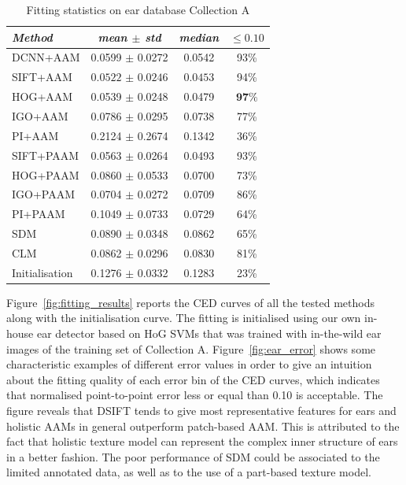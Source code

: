 \begin{table}[t!]
\small
\centering
\begin{tabular}{|l|c|c|c|}
\hline
\emph{Method}   & \emph{mean $\pm$ std} & \emph{median} & $\leq 0.10$\\
\hline\hline
DCNN+AAM & 0.0599 $\pm$ 0.0272  & 0.0542 & 93\%\\
SIFT+AAM & $\bm{0.0522}$ $\pm$ $\bm{0.0246}$  & $\bm{0.0453}$ & 94\%\\
HOG+AAM & 0.0539 $\pm$ 0.0248  & 0.0479 & $\bm{97\%}$ \\
IGO+AAM & 0.0786 $\pm$ 0.0295  & 0.0738 & 77\%\\
PI+AAM & 0.2124 $\pm$ 0.2674  & 0.1342 & 36\%\\
\hline
SIFT+PAAM & 0.0563 $\pm$ 0.0264  & 0.0493 & 93\%\\
HOG+PAAM & 0.0860 $\pm$ 0.0533  & 0.0700 & 73\%\\
IGO+PAAM & 0.0704 $\pm$ 0.0272  & 0.0709 & 86\%\\
PI+PAAM & 0.1049 $\pm$ 0.0733  & 0.0729 & 64\%\\
\hline
SDM & 0.0890 $\pm$ 0.0348  & 0.0862 & 65\%\\
CLM & 0.0862 $\pm$ 0.0296  & 0.0830 & 81\%\\
\hline
Initialisation & 0.1276 $\pm$ 0.0332  & 0.1283 & 23\%\\
\hline
\end{tabular}
\caption{Fitting statistics on ear database Collection A}
\label{tab:ear_stats}
\end{table}


Figure~\ref{fig:fitting_results} reports the CED curves of all the tested methods along with the initialisation curve. The fitting is initialised using our own in-house ear detector based on HoG SVMs that was trained with in-the-wild ear images of the training set of Collection A. Figure~\ref{fig:ear_error} shows some characteristic examples of different error values in order to give an intuition about the fitting quality of each error bin of the CED curves, which indicates that normalised point-to-point error less or equal than 0.10 is acceptable. The figure reveals that DSIFT tends to give most representative features for ears and holistic AAMs in general outperform patch-based AAM. This is attributed to the fact that holistic texture model can represent the complex inner structure of ears in a better fashion. The poor performance of SDM could be associated to the limited annotated data, as well as to the use of a part-based texture model. 


